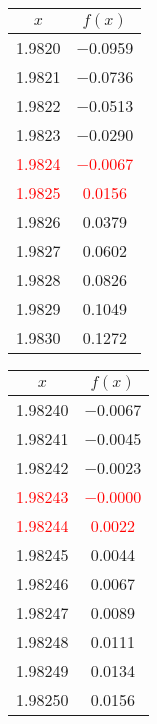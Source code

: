 \documentclass{article}
\begin{document}
\begin{enumerate}
\begin{enumerate}
\begin{tabular}{|c|c|}
            \end{tabular}\quad
            \begin{tabular}{|c|c|}
            \hline
            $x$   & $f(x)$ \\
            \hline
            \num{1,9820} & \num{-0,0959} \\
            \num{1,9821} & \num{-0,0736} \\
            \num{1,9822} & \num{-0,0513} \\
            \num{1,9823} & \num{-0,0290} \\
            \textcolor{red}{\num{1,9824}} & \textcolor{red}{\num{-0,0067}} \\
            \textcolor{red}{\num{1,9825}} & \textcolor{red}{\num{0,0156}} \\
            \num{1,9826} & \num{0,0379} \\
            \num{1,9827} & \num{0,0602} \\
            \num{1,9828} & \num{0,0826} \\
            \num{1,9829} & \num{0,1049} \\
            \num{1,9830} & \num{0,1272} \\
            \hline
            \end{tabular}\quad
            \begin{tabular}{|c|c|}
            \hline
            $x$   & $f(x)$ \\
            \hline
            \num{1,98240} & \num{-0,0067} \\
            \num{1,98241} & \num{-0,0045} \\
            \num{1,98242} & \num{-0,0023} \\
            \textcolor{red}{\num{1,98243}} & \textcolor{red}{\num{-0,0000}} \\
            \textcolor{red}{\num{1,98244}} & \textcolor{red}{\num{0,0022}} \\
            \num{1,98245} & \num{0,0044} \\
            \num{1,98246} & \num{0,0067} \\
            \num{1,98247} & \num{0,0089} \\
            \num{1,98248} & \num{0,0111} \\
            \num{1,98249} & \num{0,0134} \\
            \num{1,98250} & \num{0,0156} \\
            \hline
            \end{tabular}\quad \\
            

\end{enumerate}
\end{enumerate}
\end{document}
